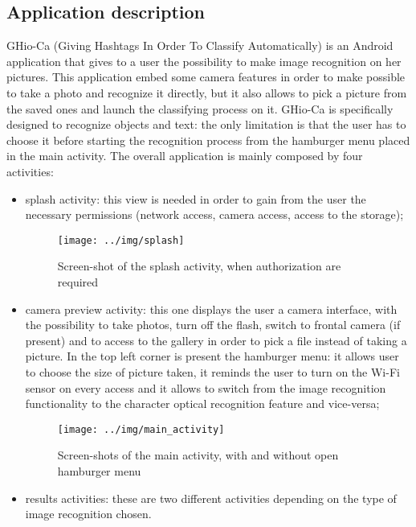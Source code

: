 \subsection{Application description}
GHio-Ca (Giving Hashtags In Order To Classify Automatically) is an Android
application that gives to a user the possibility to make image recognition on
her pictures. This application embed some camera features in order to make
possible to take a photo and recognize it directly, but it also allows to pick
a picture from the saved ones and launch the classifying process on it.
GHio-Ca is specifically designed to recognize objects and text: the only
limitation is that the user has to choose it before starting the
recognition process from the hamburger menu placed in the main activity.
The overall application is mainly composed by four activities:
\begin{itemize}
  \item splash activity: this view is needed in order to gain from the user
    the necessary permissions (network access, camera access, access to
    the storage);
    \begin{figure}[h]
        \centering
        \texttt{[image: ../img/splash]}
        \caption{Screen-shot of the splash activity, when authorization are 
                 required}
        \label{fig:splash}
    \end{figure}
  \item camera preview activity: this one displays the user a camera
    interface, with the possibility to take photos, turn off the flash, switch
    to frontal camera (if present) and to access to the gallery in order to
    pick a file instead of taking a picture. In the top left corner is present
    the hamburger menu: it allows user to choose the size of picture taken,
    it reminds the user to turn on the Wi-Fi sensor on every access and it
    allows to switch from the image recognition functionality to the
    character optical recognition feature and vice-versa;
    \begin{figure}[h]
        \centering
        \texttt{[image: ../img/main\_activity]}
        \caption{Screen-shots of the main activity, with and without open 
                 hamburger menu}
        \label{fig:splash}
    \end{figure}
  \item results activities: these are two different activities depending on
    the type of image recognition chosen.
    \begin{itemize}

\end{itemize}
\end{itemize}
